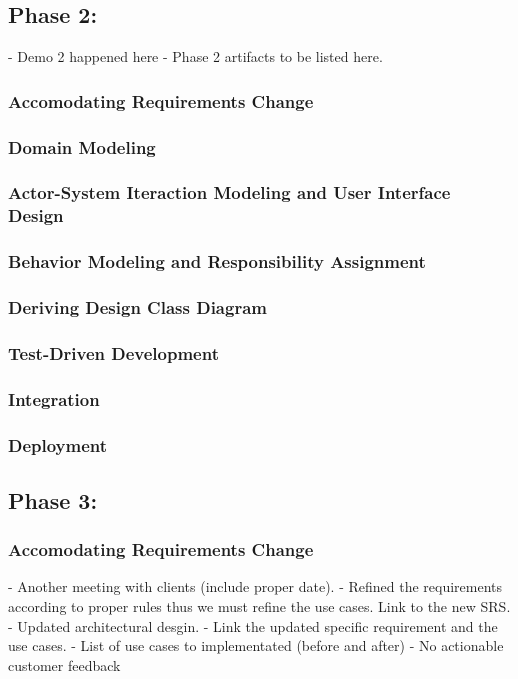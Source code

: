 \documentclass[11pt]{article}
\begin{document}
\subsection{Phase 2:} 
 - Demo 2 happened here
 - Phase 2 artifacts to be listed here.

\subsubsection{Accomodating Requirements Change}
 
\subsubsection{Domain Modeling}
  
\subsubsection{Actor-System Iteraction Modeling and User Interface Design}
  
\subsubsection{Behavior Modeling and Responsibility Assignment}
  
\subsubsection{Deriving Design Class Diagram}
  
\subsubsection{Test-Driven Development}
  
\subsubsection{Integration}
  
\subsubsection{Deployment}

\subsection{Phase 3:}

\subsubsection{Accomodating Requirements Change}
- Another meeting with clients (include proper date).
- Refined the requirements according to proper rules thus we must refine the use cases. Link to the new SRS.
- Updated architectural desgin.
- Link the updated specific requirement and the use cases.
- List of use cases to implementated (before and after)
- No actionable customer feedback
\end{document}
